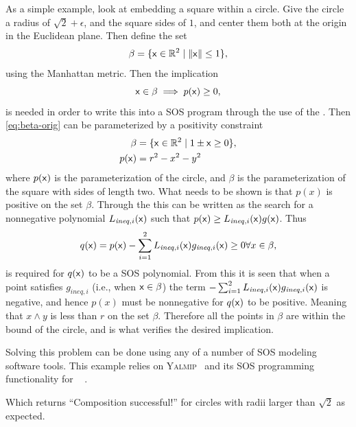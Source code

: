 \begin{example}

  As a simple example, look at embedding a square within a circle. Give the
  circle a radius of \(\sqrt{2}+\epsilon\), and the square sides of \(1\), and
  center them both at the origin in the Euclidean plane. Then define the
  set
  \begin{equation}
    \label{eq:beta-orig}
    \beta = \lbrace{\mathbf{\mathsf{x}}} \in \mathbb{R}^2 \mid \lVert{\mathbf{\mathsf{x}}}\rVert \leq 1\rbrace,
  \end{equation} 
  using the Manhattan metric. Then the implication
  \begin{equation}
    {\mathbf{\mathsf{x}}} \in \beta \implies p({\mathbf{\mathsf{x}}}) \geq 0,
  \end{equation}
  is needed in order to write this into a \ac{SOS} program through the use of
  the . Then \eqref{eq:beta-orig} can be parameterized
  by a positivity constraint
  \begin{align}
    \beta &= \lbrace{\mathbf{\mathsf{x}}} \in \mathbb{R}^2 \mid 1 \pm {\mathbf{\mathsf{x}}} \geq 0 \rbrace, \\
    p({\mathbf{\mathsf{x}}}) &= r^2 - x^2 - y^2
  \end{align}
  where \(p({\mathbf{\mathsf{x}}})\) is the parameterization of the circle, and \(\beta\) is
  the parameterization of the square with sides of length two. What needs to be
  shown is that \(p(x)\) is positive on the set \(\beta\). Through the
   this can be written as the search for a nonnegative
  polynomial \(L_{\mathit{\mathit{ineq}},i}({\mathbf{\mathsf{x}}})\) such that \(p({\mathbf{\mathsf{x}}}) \geq
  L_{\mathit{\mathit{ineq}},i}({\mathbf{\mathsf{x}}})g({\mathbf{\mathsf{x}}}) \). Thus
  \begin{equation}
    q({\mathbf{\mathsf{x}}}) = p({\mathbf{\mathsf{x}}}) -
    \sum_{i=1}^{2}L_{\mathit{\mathit{ineq}},i}({\mathbf{\mathsf{x}}})g_{\mathit{\mathit{ineq}},i}({\mathbf{\mathsf{x}}}) \geq 0 \forall x \in \beta,
  \end{equation} 
  is required for \(q({\mathbf{\mathsf{x}}})\) to be a \ac{SOS} polynomial. From this it is
  seen that when a point satisfies \(g_{\mathit{\mathit{ineq}},i}\) (i.e., when
  \({\mathbf{\mathsf{x}}} \in \beta\)) the term \( -
  \sum_{i=1}^{2}L_{\mathit{\mathit{ineq}},i}({\mathbf{\mathsf{x}}})g_{\mathit{\mathit{ineq}},i}({\mathbf{\mathsf{x}}})\)
  is negative, and hence \(p(x)\) must be nonnegative for \(q({\mathbf{\mathsf{x}}})\) to be
  positive. Meaning that \(x \wedge y\) is less than \(r\) on the set \(\beta\).
  Therefore all the points in \(\beta\) are within the bound of the circle, and
  is what verifies the desired implication.

  Solving this problem can be done using any of a number of \ac{SOS} modeling
  software tools. This example relies on \textsc{Yalmip}~\cite{Lofberg2004} and
  its \ac{SOS} programming functionality for \matlab~\cite{Lofberg2009} .


  

  Which returns ``Composition successful!'' for circles with radii larger than
  \(\sqrt{2}\) as expected.
\end{example}

